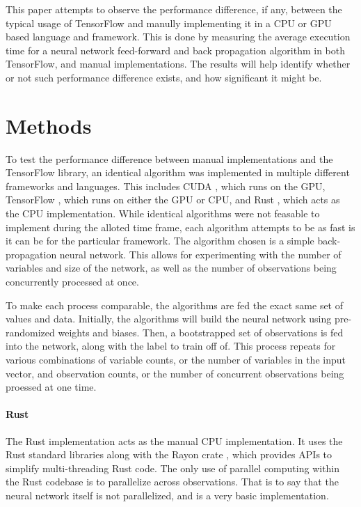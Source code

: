 \documentclass[12pt]{article}
\begin{document}
This paper attempts to observe the performance difference, if any, between the typical usage of TensorFlow and manully implementing it in a CPU or GPU based language and framework.
This is done by measuring the average execution time for a neural network feed-forward and back propagation algorithm in both TensorFlow, and manual implementations.
The results will help identify whether or not such performance difference exists, and how significant it might be.




\section{Methods}

To test the performance difference between manual implementations and the TensorFlow library, an identical algorithm was implemented in multiple different frameworks and languages.
This includes CUDA \cite{lib_cuda}, which runs on the GPU, TensorFlow \cite{lib_tensorflow}, which runs on either the GPU or CPU, and Rust \cite{lang_rust}, which acts as the CPU implementation.
While identical algorithms were not feasable to implement during the alloted time frame, each algorithm attempts to be as fast is it can be for the particular framework.
The algorithm chosen is a simple back-propagation neural network.
This allows for experimenting with the number of variables and size of the network, as well as the number of observations being concurrently processed at once.

To make each process comparable, the algorithms are fed the exact same set of values and data.
Initially, the algorithms will build the neural network using pre-randomized weights and biases.
Then, a bootstrapped set of observations is fed into the network, along with the label to train off of.
This process repeats for various combinations of variable counts, or the number of variables in the input vector, and observation counts, or the number of concurrent observations being proessed at one time.

\paragraph{Rust}
The Rust \cite{lang_rust} implementation acts as the manual CPU implementation.
It uses the Rust standard libraries along with the Rayon crate \cite{lib_rayon}, which provides APIs to simplify multi-threading Rust code.
The only use of parallel computing within the Rust codebase is to parallelize across observations.
That is to say that the neural network itself is not parallelized, and is a very basic implementation.
\end{document}
